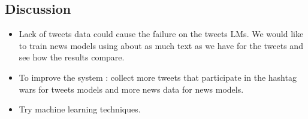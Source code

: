 \documentclass[a0,portrait]{a0poster}
\begin{document}
\begin{multicols}{2}
\section*{\LARGE Discussion}

\begin{itemize}
\item Lack of tweets data could cause the failure on the tweets LMs. We would like to train news models using about as much text as we have for the tweets and see how the results compare.
\item To improve the system : collect more tweets that participate in the hashtag wars for tweets models and more news data for news models. 
\item Try machine learning techniques.
\end{itemize}




\nocite{*} %
\small  %





\end{multicols}
\end{document}
